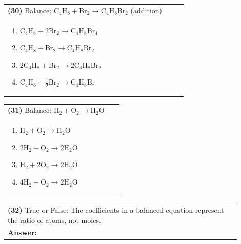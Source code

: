 \documentclass{article}
\begin{document}
\vspace{0.2cm}
\noindent \begin{tabular}{|p{0.9\linewidth}|}
\hline
\vspace{0.2cm}
\textbf{(30)} Balance: \(\mathrm{C_4H_8 + Br_2 \rightarrow C_4H_8Br_2}\) (addition)\\
\begin{minipage}[t]{0.85\linewidth}
\begin{enumerate}[label=\alph*.]
   \item \(\mathrm{C_4H_8 + 2Br_2 \rightarrow C_4H_8Br_4}\)
   \item \(\mathrm{C_4H_8 + Br_2 \rightarrow C_4H_8Br_2}\)
   \item \(\mathrm{2C_4H_8 + Br_2 \rightarrow 2C_4H_8Br_2}\)
   \item \(\mathrm{C_4H_8 + \tfrac{1}{2}Br_2 \rightarrow C_4H_8Br}\)
\end{enumerate}
\end{minipage}\\
\hline
\end{tabular}

\vspace{0.2cm}
\noindent \begin{tabular}{|p{0.9\linewidth}|}
\hline
\vspace{0.2cm}
\textbf{(31)} Balance: $\mathrm{H_2 + O_2 \rightarrow H_2O}$\\
\begin{minipage}[t]{0.85\linewidth}
\begin{enumerate}[label=\alph*.]
\item $\mathrm{H_2 + O_2 \rightarrow H_2O}$
\item $\mathrm{2H_2 + O_2 \rightarrow 2H_2O}$
\item $\mathrm{H_2 + 2O_2 \rightarrow 2H_2O}$
\item $\mathrm{4H_2 + O_2 \rightarrow 2H_2O}$
\end{enumerate}
\end{minipage}\\
\hline
\end{tabular}

\vspace{0.2cm}
\noindent \begin{tabular}{|p{0.9\linewidth}|}
\hline
\vspace{0.2cm}
\textbf{(32)} True or False: The coefficients in a balanced equation represent the ratio of atoms, not moles.\\
\textbf{Answer:} \underline{\hspace{2cm}}\\
\hline
\end{tabular}
\newpage
\end{document}
